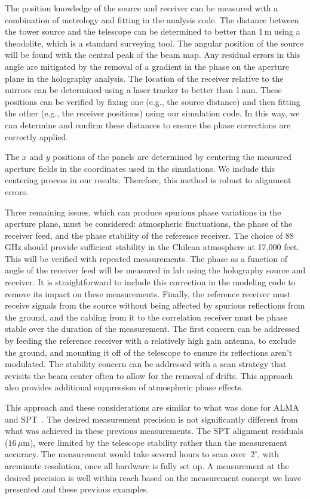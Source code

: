 The position knowledge of the source and receiver can be measured with a combination of metrology and fitting in the analysis code.  The distance between the tower source and the telescope can be determined to better than 1\,m using a theodolite, which is a standard surveying tool.  The angular position of the source will be found with the central peak of the beam map.  Any residual errors in this angle are mitigated by the removal of a gradient in the phase on the aperture plane in the holography analysis.  The location of the receiver relative to the mirrors can be determined using a laser tracker to better than 1\,mm.  These positions can be verified by fixing one (e.g., the source distance) and then fitting the other (e.g., the receiver positions) using our simulation code.  In this way, we can determine and confirm these distances to ensure the phase corrections are correctly applied.  

The $x$ and $y$ positions of the panels are determined by centering the measured aperture fields in the coordinates used in the simulations.  We include this centering process in our results.  Therefore, this method is robust to alignment errors.

Three remaining issues, which can produce spurious phase variations in the aperture plane, must be considered: atmospheric fluctuations, the phase of the receiver feed, and the phase stability of the reference receiver.  The choice of 88 GHz should provide sufficient stability in the Chilean atmosphere at 17,000 feet.  This will be verified with repeated measurements.  The phase as a function of angle of the receiver feed will be measured in lab using the holography source and receiver.  It is straightforward to include this correction in the modeling code to remove its impact on these measurements.  Finally, the reference receiver must receive signals from the source without being affected by spurious reflections from the ground, and the cabling from it to the correlation receiver must be phase stable over the duration of the measurement.  The first concern can be addressed by feeding the reference receiver with a relatively high gain antenna, to exclude the ground, and mounting it off of the telescope to ensure its reflections aren't modulated.  The stability concern can be addressed with a scan strategy that revisits the beam center often to allow for the removal of drifts.  This approach also provides additional suppression of atmospheric phase effects.  

This approach and these considerations are similar to what was done for ALMA~\cite{alma_holog} and SPT~\cite{Carlstrom_2011}. The desired measurement precision is not significantly different from what was achieved in these previous measurements.  The SPT alignment residuals ($16\,\mu$m), were limited by the telescope stability rather than the measurement accuracy.  The measurement would take several hours to scan over $~2^\circ$, with arcminute resolution, once all hardware is fully set up.  A measurement at the desired precision is well within reach based on the measurement concept we have presented and these previous examples.

